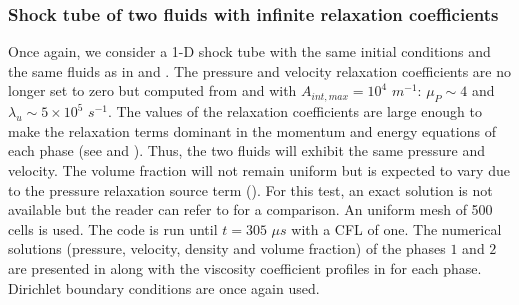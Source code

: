 \documentclass[preprint,10pt]{elsarticle}
\begin{document}
\subsubsection{Shock tube of two fluids with infinite relaxation coefficients}\label{sec:shock-tube-infinite-rel-coeff}
%
Once again, we consider a 1-D shock tube with the same initial conditions and the same fluids as in  and . 
The pressure and velocity relaxation coefficients are no longer set to zero but computed from  and  with $A_{int,max} =  
10^4$ $m^{-1}$: $\mu_P \sim 4$ and $\lambda_u \sim 5 \times 10^5$ $s^{-1}$. The values of the relaxation coefficients are large enough to make the 
relaxation terms dominant in the momentum and energy equations of each phase (see  and ). Thus, the two fluids will exhibit the 
same pressure and velocity. The volume fraction will not remain uniform but is expected to vary due to the pressure relaxation source term (). For 
this test, an exact solution is not available but the reader can refer to \cite{Saurel_2007} for a comparison. An uniform mesh of 500 cells is used. The code is 
run until $t = 305$ $\mu s$ with a CFL of one. The numerical solutions (pressure, velocity, density and volume fraction) of the phases $1$ and $2$ are presented in  along with the viscosity coefficient profiles in  for each phase. Dirichlet boundary conditions are once again used.
%
\end{document}
